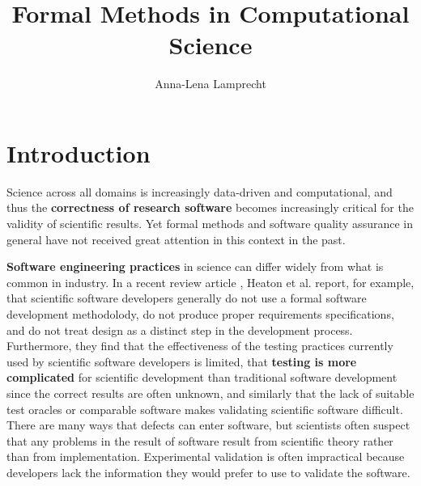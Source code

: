 \documentclass[sigplan,10pt,noacm]{acmart}
\begin{document}
\title{Formal Methods in Computational Science}
\author{Anna-Lena Lamprecht}

\maketitle


\section{Introduction}


Science across all domains is increasingly data-driven and computational, and thus the \textbf{correctness of research software} becomes increasingly critical for the validity of scientific results. Yet formal methods and software quality assurance in general have not received great attention in this context in the past.

\textbf{Software engineering practices} in science can differ widely from what is common in industry. In a recent review article \cite{HeaCar2015}, Heaton et al. report, for example, that scientific software developers generally do not use a formal software development methodolody, do not produce proper requirements specifications, and do not treat design as a distinct step in the development process. Furthermore, they find that the effectiveness of the testing practices currently used by scientific software developers is limited, that \textbf{testing is more complicated} for scientific development than traditional software development since the correct results are often unknown, and similarly that the lack of suitable test oracles or comparable software makes validating scientific software difficult. There are many ways that defects can enter software, but scientists often suspect that any problems in the result of software result from scientific theory rather than from implementation. Experimental validation is often impractical because developers lack the information they would prefer to use to validate the software. 
\end{document}
